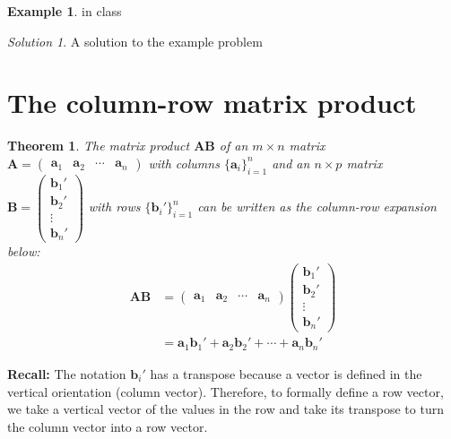 \documentclass[
]{book}
\newtheorem{theorem}{Theorem}[chapter]
\theoremstyle{definition}
\theoremstyle{definition}
\newtheorem{example}{Example}[chapter]
\theoremstyle{definition}
\theoremstyle{definition}
\theoremstyle{remark}
\newtheorem*{solution}{Solution}
\begin{document}
\begin{example}
in class
\end{example}

\begin{solution}
A solution to the example problem
\end{solution}

\hypertarget{the-column-row-matrix-product}{%
\section{The column-row matrix product}\label{the-column-row-matrix-product}}

\begin{theorem}
\protect\hypertarget{thm:block-matrix-multiplication}{}\label{thm:block-matrix-multiplication}The matrix product \(\mathbf{A}\mathbf{B}\) of an \(m \times n\) matrix \(\mathbf{A} = \begin{pmatrix} \mathbf{a}_1 & \mathbf{a}_2 & \cdots & \mathbf{a}_n \end{pmatrix}\) with columns \(\{\mathbf{a}_i\}_{i=1}^n\) and an \(n \times p\) matrix \(\mathbf{B} = \begin{pmatrix} \mathbf{b}_1' \\ \mathbf{b}_2' \\ \vdots \\ \mathbf{b}_n' \end{pmatrix}\) with rows \(\{\mathbf{b}_i'\}_{i=1}^n\) can be written as the column-row expansion below:
\[
\begin{aligned}
\mathbf{A} \mathbf{B} & =
\begin{pmatrix} \mathbf{a}_1 & \mathbf{a}_2 & \cdots & \mathbf{a}_n \end{pmatrix} \begin{pmatrix} \mathbf{b}_1' \\ \mathbf{b}_2' \\ \vdots \\ \mathbf{b}_n' \end{pmatrix} \\
& = \mathbf{a}_1 \mathbf{b}_1' + \mathbf{a}_2 \mathbf{b}_2' + \cdots + \mathbf{a}_n \mathbf{b}_n'
\end{aligned} 
\label{eq:block-matrix-multiplication}
\]
\end{theorem}

\textbf{Recall:} The notation \(\mathbf{b}_i'\) has a transpose because a vector is defined in the vertical orientation (column vector). Therefore, to formally define a row vector, we take a vertical vector of the values in the row and take its transpose to turn the column vector into a row vector.
\end{document}
